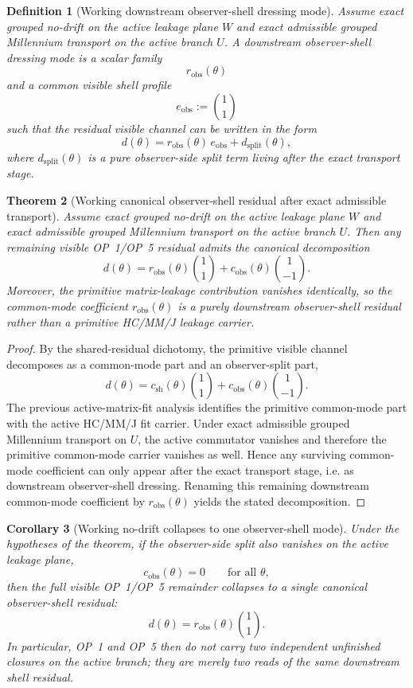 \documentclass[12pt,a4paper]{article}
\newtheorem{theorem}{Theorem}[section]
\newtheorem{corollary}[theorem]{Corollary}
\newtheorem{definition}[theorem]{Definition}
\begin{document}
\begin{definition}[Working downstream observer-shell dressing mode]
Assume exact grouped no-drift on the active leakage plane $W$ and exact admissible grouped Millennium transport on the active branch $U$. A downstream observer-shell dressing mode is a scalar family
\[
 r_{\mathrm{obs}}(\theta)
\]
and a common visible shell profile
\[
 e_{\mathrm{obs}}:=\binom{1}{1}
\]
such that the residual visible channel can be written in the form
\[
 d(\theta)=r_{\mathrm{obs}}(\theta)\,e_{\mathrm{obs}}+d_{\mathrm{split}}(\theta),
\]
where $d_{\mathrm{split}}(\theta)$ is a pure observer-side split term living after the exact transport stage.
\end{definition}

\begin{theorem}[Working canonical observer-shell residual after exact admissible transport]
Assume exact grouped no-drift on the active leakage plane $W$ and exact admissible grouped Millennium transport on the active branch $U$. Then any remaining visible OP~1/OP~5 residual admits the canonical decomposition
\[
 d(\theta)=r_{\mathrm{obs}}(\theta)\binom{1}{1}+c_{\mathrm{obs}}(\theta)\binom{1}{-1}.
\]
Moreover, the primitive matrix-leakage contribution vanishes identically, so the common-mode coefficient $r_{\mathrm{obs}}(\theta)$ is a purely downstream observer-shell residual rather than a primitive HC/MM/J leakage carrier.
\end{theorem}

\begin{proof}
By the shared-residual dichotomy, the primitive visible channel decomposes as a common-mode part and an observer-split part,
\[
 d(\theta)=c_{\mathrm{sh}}(\theta)\binom{1}{1}+c_{\mathrm{obs}}(\theta)\binom{1}{-1}.
\]
The previous active-matrix-fit analysis identifies the primitive common-mode part with the active HC/MM/J fit carrier. Under exact admissible grouped Millennium transport on $U$, the active commutator vanishes and therefore the primitive common-mode carrier vanishes as well. Hence any surviving common-mode coefficient can only appear after the exact transport stage, i.e. as downstream observer-shell dressing. Renaming this remaining downstream common-mode coefficient by $r_{\mathrm{obs}}(\theta)$ yields the stated decomposition.
\end{proof}

\begin{corollary}[Working no-drift collapses to one observer-shell mode]
Under the hypotheses of the theorem, if the observer-side split also vanishes on the active leakage plane,
\[
 c_{\mathrm{obs}}(\theta)=0\qquad\text{for all }\theta,
\]
then the full visible OP~1/OP~5 remainder collapses to a single canonical observer-shell residual:
\[
 d(\theta)=r_{\mathrm{obs}}(\theta)\binom{1}{1}.
\]
In particular, OP~1 and OP~5 then do not carry two independent unfinished closures on the active branch; they are merely two reads of the same downstream shell residual.
\end{corollary}
\end{document}
